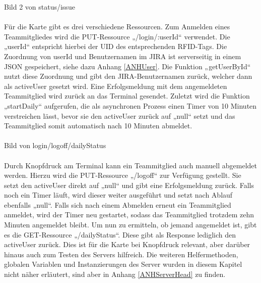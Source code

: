 \documentclass[12pt,titlepage]{scrartcl}
\begin{document}
			Bild 2 von status/issue \\ \\
			Für die Karte gibt es drei verschiedene Ressourcen. Zum Anmelden eines Teammitgliedes wird die PUT-Ressource „/login/:userId“ verwendet. Die „userId“ entspricht hierbei der UID des entsprechenden RFID-Tags. Die Zuordnung von userId und Benutzernamen im JIRA ist serverseitig in einem JSON gespeichert, siehe dazu Anhang \ref{ANHUser}. Die Funktion „getUserById“ nutzt diese Zuordnung und gibt den JIRA-Benutzernamen zurück, welcher dann als activeUser gesetzt wird. Eine Erfolgsmeldung mit dem angemeldeten Teammitglied wird zurück an das Terminal gesendet. Zuletzt wird die Funktion „startDaily“ aufgerufen, die als asynchronen Prozess einen Timer von 10 Minuten verstreichen lässt, bevor sie den activeUser zurück auf „null“ setzt und das Teammitglied somit automatisch nach 10 Minuten abmeldet. \\ \\
			Bild von login/logoff/dailyStatus \\ \\
			Durch Knopfdruck am Terminal kann ein Teammitglied auch manuell abgemeldet werden. Hierzu wird die PUT-Ressource „/logoff“ zur Verfügung gestellt. Sie setzt den activeUser direkt auf „null“ und gibt eine Erfolgsmeldung zurück. Falls noch ein Timer läuft, wird dieser weiter ausgeführt und setzt nach Ablauf ebenfalls „null“. Falls sich nach einem Abmelden erneut ein Teammitglied anmeldet, wird der Timer neu gestartet, sodass das Teammitglied trotzdem zehn Minuten angemeldet bleibt. Um nun zu ermitteln, ob jemand angemeldet ist, gibt es die GET-Ressource „/dailyStatus“. Diese gibt als Response lediglich den activeUser zurück. Dies ist für die Karte bei Knopfdruck relevant, aber darüber hinaus auch zum Testen des Servers hilfreich. Die weiteren Helfermethoden, globalen Variablen und Instanzierungen des Server wurden in diesem Kapitel nicht näher erläutert, sind aber in Anhang \ref{ANHServerHead} zu finden.
\end{document}
